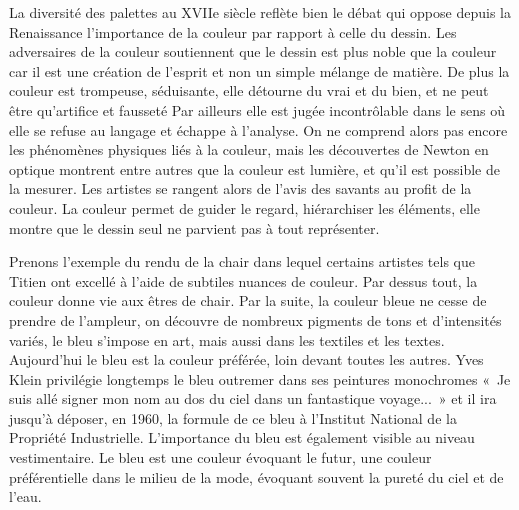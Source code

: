 \xspace
	La diversité des palettes au XVIIe siècle reflète bien le débat qui oppose depuis la Renaissance l'importance de la couleur par rapport à celle du dessin. Les adversaires de la couleur soutiennent que le dessin est plus noble que la couleur car il est une création de l'esprit et non un simple mélange de matière. 
De plus la couleur est trompeuse, séduisante, elle détourne du vrai et du bien, et ne peut être qu'artifice et fausseté Par ailleurs elle est jugée incontrôlable dans le sens où  elle se refuse au langage et échappe à l'analyse. On ne comprend alors pas encore les phénomènes physiques liés à la couleur, mais les découvertes de Newton en optique montrent entre autres que la couleur est lumière, et qu'il est possible de la mesurer. Les artistes se rangent alors de l'avis des savants au profit de la couleur. La couleur permet de guider le regard, hiérarchiser les éléments, elle montre que le dessin seul ne parvient pas à tout représenter. 


	Prenons l'exemple du rendu de la chair dans lequel certains artistes tels que Titien ont excellé à l'aide de subtiles nuances de couleur. Par dessus tout, la couleur donne vie aux êtres de chair. Par la suite, la couleur bleue ne cesse de prendre de l'ampleur, on découvre de nombreux pigments de tons et d'intensités variés, le bleu s'impose en art, mais aussi dans les textiles et les textes. Aujourd’hui le bleu est la couleur préférée, loin devant toutes les autres. 
Yves Klein privilégie longtemps le bleu outremer dans ses peintures monochromes « Je suis allé signer mon nom au dos du ciel dans un fantastique voyage... » et il ira jusqu’à déposer, en 1960, la formule de ce bleu à l’Institut National de la Propriété Industrielle. L’importance du bleu est également visible au niveau vestimentaire. Le bleu est une couleur évoquant le futur, une couleur préférentielle dans le milieu de la mode, évoquant souvent la pureté du ciel et de l'eau.

\xspace
{}


